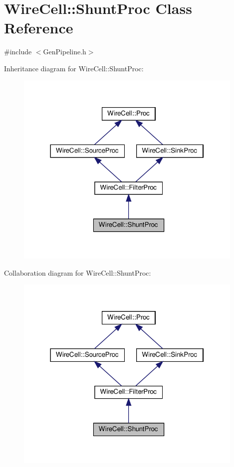 \hypertarget{class_wire_cell_1_1_shunt_proc}{}\section{Wire\+Cell\+:\+:Shunt\+Proc Class Reference}
\label{class_wire_cell_1_1_shunt_proc}


{\ttfamily \#include $<$Gen\+Pipeline.\+h$>$}



Inheritance diagram for Wire\+Cell\+:\+:Shunt\+Proc\+:
\nopagebreak
\begin{figure}[H]
\begin{center}
\leavevmode
\includegraphics[width=310pt]{class_wire_cell_1_1_shunt_proc__inherit__graph}
\end{center}
\end{figure}


Collaboration diagram for Wire\+Cell\+:\+:Shunt\+Proc\+:
\nopagebreak
\begin{figure}[H]
\begin{center}
\leavevmode
\includegraphics[width=310pt]{class_wire_cell_1_1_shunt_proc__coll__graph}
\end{center}
\end{figure}
